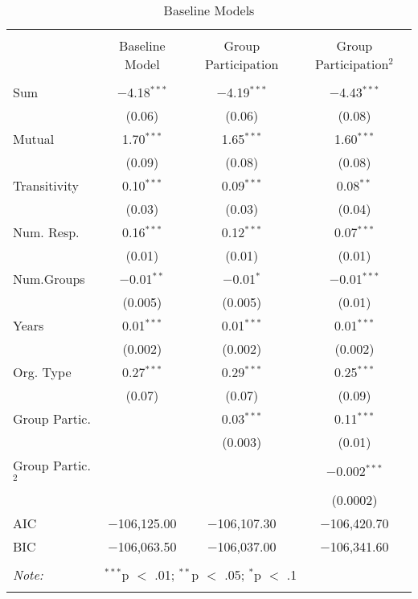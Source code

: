 
\begin{table}[!htbp] \centering 
  \caption{Baseline Models} 
  \label{table:basemods} 
\begin{tabular}{@{\extracolsep{5pt}}lccc} 
\\[-1.8ex]\hline \\[-1.8ex] 
 & Baseline Model & Group Participation & Group Participation$^2$ \\ 
\hline \\[-1.8ex] 
 Sum & $-$4.18$^{***}$ & $-$4.19$^{***}$ & $-$4.43$^{***}$ \\ 
  & (0.06) & (0.06) & (0.08) \\ 
  Mutual & 1.70$^{***}$ & 1.65$^{***}$ & 1.60$^{***}$ \\ 
  & (0.09) & (0.08) & (0.08) \\ 
  Transitivity & 0.10$^{***}$ & 0.09$^{***}$ & 0.08$^{**}$ \\ 
  & (0.03) & (0.03) & (0.04) \\ 
  Num. Resp. & 0.16$^{***}$ & 0.12$^{***}$ & 0.07$^{***}$ \\ 
  & (0.01) & (0.01) & (0.01) \\ 
  Num.Groups & $-$0.01$^{**}$ & $-$0.01$^{*}$ & $-$0.01$^{***}$ \\ 
  & (0.005) & (0.005) & (0.01) \\ 
  Years & 0.01$^{***}$ & 0.01$^{***}$ & 0.01$^{***}$ \\ 
  & (0.002) & (0.002) & (0.002) \\ 
  Org. Type & 0.27$^{***}$ & 0.29$^{***}$ & 0.25$^{***}$ \\ 
  & (0.07) & (0.07) & (0.09) \\ 
  Group Partic. &  & 0.03$^{***}$ & 0.11$^{***}$ \\ 
  &  & (0.003) & (0.01) \\ 
  Group Partic.$^2$ &  &  & $-$0.002$^{***}$ \\ 
  &  &  & (0.0002) \\ 
 AIC & $-$106,125.00 & $-$106,107.30 & $-$106,420.70 \\ 
BIC & $-$106,063.50 & $-$106,037.00 & $-$106,341.60 \\ 
\hline \\[-1.8ex] 
\textit{Note:} & \multicolumn{3}{l}{$^{***}$p $<$ .01; $^{**}$p $<$ .05; $^{*}$p $<$ .1} \\ 
\normalsize 
\end{tabular} 
\end{table} 
